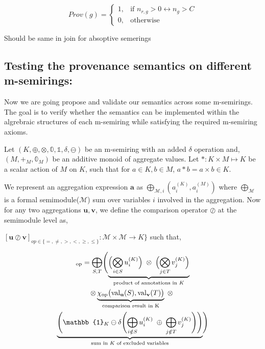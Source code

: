 \documentclass[twocolumn]{article}
\begin{document}
$$Prov(g) = \begin{cases}
   1, & \text{if } n_{r, g} > 0 \leftrightarrow n_g > C \\
   0, & \text{otherwise}
   \end{cases}$$

Should be same in join for absoptive semerings

\subsection{Testing the provenance semantics on different m-semirings:}
Now we are going propose and validate our semantics across some m-semirings. The goal is to 
verify whether the semantics can be implemented within the algrebraic structures of each m-semiring 
while satisfying the required m-semiring axioms.

Let $(K,\oplus,\otimes,\mathbb{0},\mathbb{1},\delta,\ominus)$ be an m-semiring with an 
added $\delta$ operation and, $(M,+_M,\mathbb{0}_M)$ be an 
additive monoid of aggregate values. Let $*:K\times M \mapsto K$ be a scalar action of $M$ on $K$, such that for $a \in K, b \in M$, 
$a * b = a \times b \in K$.

We represent an aggregation expression $\mathbf{a}$ as  $\bigoplus_{\mathcal{M},i}(a_i^{(K)},a_i^{(M)})$ where $\bigoplus_{\mathcal{M}}$ is a formal semimodule($\mathcal{M}$) sum over 
variables $i$ involved in the aggregation.
Now for any two aggregations $\mathbf{u},\mathbf{v}$, we define the comparison operator $\oslash$ at the semimodule level as, 

$[\mathbf{u} \oslash \mathbf{v}]_{\mathit{op}\in\{ =, \neq , >, <, \geq, \leq\}}:\mathcal{M} \times \mathcal{M} \rightarrow K\}$ such that, 

\begin{multline}
[\mathbf{u} \oslash \mathbf{v}]_{\mathrm{op}}=
\bigoplus_{S,T} 
\Biggl(
\underbrace{
\Bigl( \bigotimes_{i \in S} u_i^{(K)} \Bigr) \;\otimes\; \Bigl( \bigotimes_{j \in T} v_j^{(K)} \Bigr)
}_{\text{product of annotations in } K} \\
\otimes
\underbrace{
\chi_{\mathrm{op}}\bigl(\mathrm{val}_\mathbf{u}(S), \mathrm{val}_\mathbf{v}(T)\bigr)
}_{\text{comparison result in K}} 
\;\otimes\;\\
\underbrace{
\Biggl(\mathbb{1}_K \ominus \delta\Biggl( \bigoplus_{i \notin S} u_i^{(K)} \;\oplus\; \bigoplus_{j \notin T} v_j^{(K)} \Biggr)\Biggr)
}_{\text{sum in $K$ of excluded variables}}
\Biggr)
\end{multline}
\end{document}
